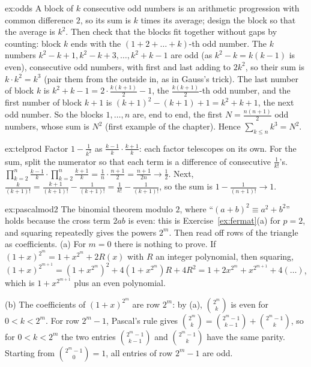 \begin{solution}{ex:odds}
\idea A block of $k$ consecutive odd numbers is an arithmetic progression with common difference $2$, so its sum is $k$ times its average; design the block so that the average is $k^2$. Then check that the blocks fit together without gaps by counting: block $k$ ends with the $(1+2+\dots+k)$-th odd number.
\writeup The $k$ numbers $k^2-k+1,k^2-k+3,\dots,k^2+k-1$ are odd (as $k^2-k=k(k-1)$ is even), consecutive odd numbers, with first and last adding to $2k^2$, so their sum is $k\cdot k^2=k^3$ (pair them from the outside in, as in Gauss's trick). The last number of block $k$ is $k^2+k-1=2\cdot\frac{k(k+1)}2-1$, the $\frac{k(k+1)}2$-th odd number, and the first number of block $k+1$ is $(k+1)^2-(k+1)+1=k^2+k+1$, the next odd number. So the blocks $1,\dots,n$ are, end to end, the first $N=\frac{n(n+1)}2$ odd numbers, whose sum is $N^2$ (first example of the chapter). Hence $\sum_{k\le n}k^3=N^2$.
\end{solution}

\begin{solution}{ex:telprod}
\idea Factor $1-\frac1{k^2}$ as $\frac{k-1}k\cdot\frac{k+1}k$: each factor telescopes on its own. For the sum, split the numerator so that each term is a difference of consecutive $\frac1{k!}$'s.
\writeup $\prod_{k=2}^n\frac{k-1}k\cdot\prod_{k=2}^n\frac{k+1}k=\frac1n\cdot\frac{n+1}2=\frac{n+1}{2n}\to\frac12$.
Next, $\frac k{(k+1)!}=\frac{k+1}{(k+1)!}-\frac1{(k+1)!}=\frac1{k!}-\frac1{(k+1)!}$, so the sum is $1-\frac1{(n+1)!}\to1$.
\end{solution}

\begin{solution}{ex:pascalmod2}
\idea The binomial theorem modulo $2$, where ``$(a+b)^2\equiv a^2+b^2$'' holds because the cross term $2ab$ is even: this is Exercise~\ref{ex:fermat}(a) for $p=2$, and squaring repeatedly gives the powers $2^m$. Then read off rows of the triangle as coefficients.
\writeup (a) For $m=0$ there is nothing to prove. If $(1+x)^{2^m}=1+x^{2^m}+2R(x)$ with $R$ an integer polynomial, then squaring,
$(1+x)^{2^{m+1}}=(1+x^{2^m})^2+4(1+x^{2^m})R+4R^2=1+2x^{2^m}+x^{2^{m+1}}+4(\dots)$, which is $1+x^{2^{m+1}}$ plus an even polynomial.

(b) The coefficients of $(1+x)^{2^m}$ are row $2^m$: by (a), $\binom{2^m}k$ is even for $0<k<2^m$. For row $2^m-1$, Pascal's rule gives $\binom{2^m}k=\binom{2^m-1}{k-1}+\binom{2^m-1}k$, so for $0<k<2^m$ the two entries $\binom{2^m-1}{k-1}$ and $\binom{2^m-1}k$ have the same parity. Starting from $\binom{2^m-1}0=1$, all entries of row $2^m-1$ are odd.
\end{solution}

